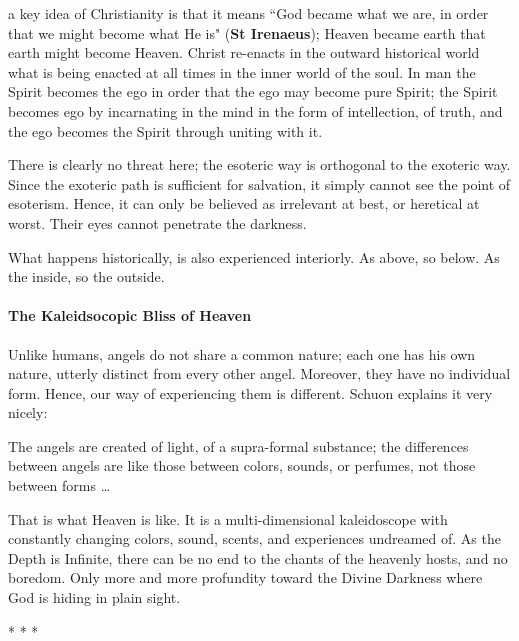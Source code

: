 \begin{quotex}
a key idea of Christianity is that it means ``God became what we are, in order that we might become what He is" (\textbf{St Irenaeus}); Heaven became earth that earth might become Heaven. Christ re-enacts in the outward historical world what is being enacted at all times in the inner world of the soul. In man the Spirit becomes the ego in order that the ego may become pure Spirit; the Spirit becomes ego by incarnating in the mind in the form of intellection, of truth, and the ego becomes the Spirit through uniting with it. 

\end{quotex}
There is clearly no threat here; the esoteric way is orthogonal to the exoteric way. Since the exoteric path is sufficient for salvation, it simply cannot see the point of esoterism. Hence, it can only be believed as irrelevant at best, or heretical at worst. Their eyes cannot penetrate the darkness.

What happens historically, is also experienced interiorly. As above, so below. As the inside, so the outside.

\paragraph{The Kaleidsocopic Bliss of Heaven}
Unlike humans, angels do not share a common nature; each one has his own nature, utterly distinct from every other angel. Moreover, they have no individual form. Hence, our way of experiencing them is different. Schuon explains it very nicely:

\begin{quotex}
The angels are created of light, of a supra-formal substance; the differences between angels are like those between colors, sounds, or perfumes, not those between forms … 

\end{quotex}
That is what Heaven is like. It is a multi-dimensional kaleidoscope with constantly changing colors, sound, scents, and experiences undreamed of. As the Depth is Infinite, there can be no end to the chants of the heavenly hosts, and no boredom. Only more and more profundity toward the Divine Darkness where God is hiding in plain sight.




\begin{center}* * *\end{center}

